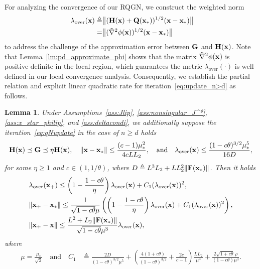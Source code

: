 \documentclass[11pt]{article}
\theoremstyle{plain}
\newtheorem{lemma}[theorem]{Lemma}
\theoremstyle{definition}
\theoremstyle{remark}
\theoremstyle{plain}
\def\F{{\bf F}}
\def\G{{\bf G}}
\def\H{{\bf H}}
\def\Q{{\bf Q}}
\def\x{{\bf x}}
\begin{document}
For analyzing the convergence of our RQGN, we construct the weighted norm 
\begin{align}\label{eq:our_measure}
\begin{split}\    
    \lambda_{\mathrm{over}}(\x)
    \triangleq & \big\|(\H(\x)+\Q(\x_*))^{1/2}(\x-\x_*)\big\| \\
    = & \big\|(\tilde{\nabla}^2\phi(\x))^{1/2}(\x-\x_*)\big\|
\end{split}
\end{align}
to address the challenge of the approximation error between $\G$ and $\H(\x)$.
Note that Lemma~\ref{lm:pd_approximate_phi} shows that the matrix $\tilde{\nabla}^2\phi(\x)$ is positive-definite in the local region, which guarantees the metric $\lambda_{\mathrm{over}}(\cdot)$ is well-defined in our local convergence analysis.
Consequently, we establish the partial relation and explicit linear quadratic rate for iteration~\eqref{eq:update_n>d} as follows.
\begin{lemma}\label{lm:GNlinearquadra}
Under Assumptions~\ref{ass:Jlip}, \ref{ass:nonsingular_J^*}, \ref{ass:x_star_philip}, and \ref{ass:deltacondi}, we additionally suppose the iteration~\eqref{eq:qNupdate} in the case of $n\geq d$ holds 
\begin{align}\label{eq:condi_x_linear_quadra}
    \H(\x)\preceq\G\preceq\eta\H(\x),\quad
    \|\x-\x_*\|\leq\frac{(c-1)\mu_*^2}{4cLL_2},\quad
    \text{and}\quad\lambda_{\mathrm{over}}(\x)\leq
    \frac{(1-c\theta)^{3/2}\mu_*^5}{16D},
\end{align}
for some $\eta\geq1$ and $c\in(1,1/\theta)$, where
$D\triangleq L^3L_2+LL_2^2\|\F(\x_*)\|$.
Then it holds
\begin{align}
& \lambda_{\mathrm{over}}(\x_{+}) \leq \left(1-\frac{1-c\theta}{\eta}\right)\lambda_{\mathrm{over}}(\x) +C_1(\lambda_{\mathrm{over}}(\x))^2, \label{eq:overfit_linear_quadra}\\
&
\|\x_{+}-\x_*\| \leq \frac{1}{\sqrt{1-c\theta}\mu}
\left(\left(1-\frac{1-c\theta}{\eta}\right)
\lambda_{\mathrm{over}}(\x) 
+C_1(\lambda_{\mathrm{over}}(\x))^2\right), \label{eq:overfit_distance_lambda} \\
& \|\x_{+}-\x\| \leq\frac{L^2+L_2\|\F(\x_*)\|}{\sqrt{1-c\theta}\mu^3}
\lambda_{\mathrm{over}}(\x), \label{eq:movedistance_lambda}
\end{align}
where 
\begin{align}\label{eq:mu-C1}
\mu=\frac{\mu_*}{\sqrt{2}} 
\quad\text{and}\quad
C_1
&\triangleq\frac{2D}{(1-c\theta)^{3/2}\mu^5}
+\left(\frac{4(1+c\theta)}{(1-c\theta)^{3/2}}+\frac{2c}{c-1}\right)\frac{LL_2}{\mu^3}
+\frac{2\sqrt{1+c\theta}\,\rho}{(1-c\theta)\mu^3}.
\end{align}
\end{lemma}
\end{document}
